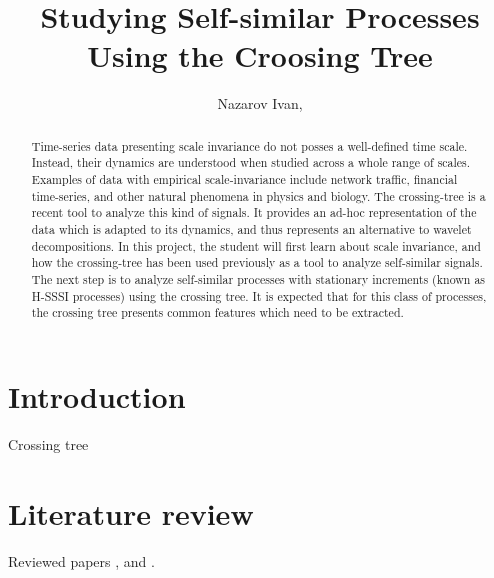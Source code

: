 \documentclass[a4paper]{article}
\title{Studying Self-similar Processes Using the Croosing Tree}
\author{Nazarov Ivan, \rus{101мНОД(ИССА)}}
\begin{document}

\clearpage


\clearpage

\maketitle
\begin{abstract}
Time-series data presenting scale invariance do not posses a well-defined time scale. Instead, their dynamics are understood when studied across a whole range of scales. Examples of data with empirical scale-invariance include network traffic, financial time-series, and other natural phenomena in physics and biology. The crossing-tree is a recent tool to analyze this kind of signals. It provides an ad-hoc representation of the data which is adapted to its dynamics, and thus represents an alternative to wavelet decompositions. In this project, the student will first learn about scale invariance, and how the crossing-tree has been used previously as a tool to analyze self-similar signals. The next step is to analyze self-similar processes with stationary increments (known as H-SSSI processes) using the crossing tree. It is expected that for this class of processes, the crossing tree presents common features which need to be extracted.
\end{abstract}
\tableofcontents
\clearpage
{}


\section{Introduction} %
\label{sec:introduction}
Crossing tree


\section{Literature review} %
\label{sec:literature_review}
Reviewed papers \cite{jones2004}, \cite{jonesshen2005} and \cite{decrouez2013}.



\clearpage
{}



% 
\end{document}
